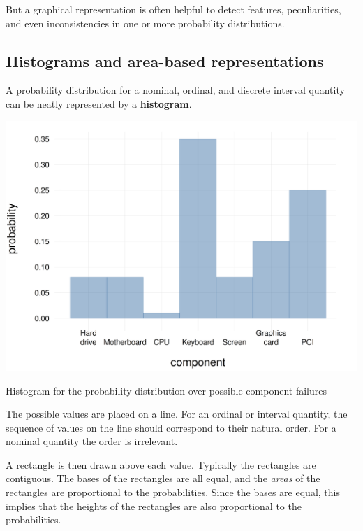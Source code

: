 \documentclass[
  a4paper,
  DIV=11,
  numbers=noendperiod,
  oneside]{scrreprt}
\begin{document}
But a graphical representation is often helpful to detect features,
peculiarities, and even inconsistencies in one or more probability
distributions.

\hypertarget{histograms-and-area-based-representations}{%
\subsection{Histograms and area-based
representations}\label{histograms-and-area-based-representations}}

A probability distribution for a nominal, ordinal, and discrete interval
quantity can be neatly represented by a {\textbf{histogram}}.

\begin{marginfigure}

{\centering \includegraphics[width=1\textwidth,height=\textheight]{example_histogram.png}

}

\caption{Histogram for the probability distribution over possible
component failures}

\end{marginfigure}

The possible values are placed on a line. For an ordinal or interval
quantity, the sequence of values on the line should correspond to their
natural order. For a nominal quantity the order is irrelevant.

A rectangle is then drawn above each value. Typically the rectangles are
contiguous. The bases of the rectangles are all equal, and the
{\emph{areas}} of the rectangles are proportional to the probabilities.
Since the bases are equal, this implies that the heights of the
rectangles are also proportional to the probabilities.
\end{document}
